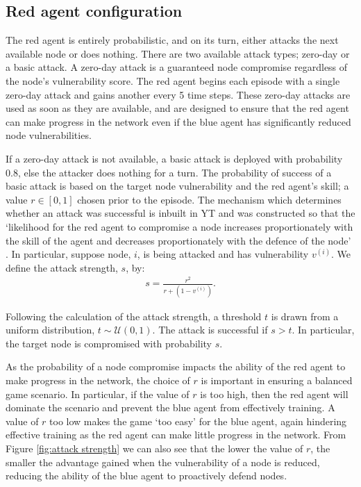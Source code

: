 \documentclass{article}
\begin{document}
\subsection{Red agent configuration}

The red agent is entirely probabilistic, and on its turn, either attacks the next available node or does nothing. There are two available attack types; zero-day or a basic attack. A zero-day attack is a guaranteed node compromise regardless of the node's vulnerability score. The red agent begins each episode with a single zero-day attack and gains another every 5 time steps. These zero-day attacks are used as soon as they are available, and are designed to ensure that the red agent can make progress in the network even if the blue agent has significantly reduced node vulnerabilities. 

If a zero-day attack is not available, a basic attack is deployed with probability 0.8, else the attacker does nothing for a turn. The probability of success of a basic attack is based on the target node vulnerability and the red agent's skill; a value $r \in [0,1]$ chosen prior to the episode. The mechanism which determines whether an attack was successful is inbuilt in YT and was constructed so that the `likelihood for the
red agent to compromise a node increases proportionately with the skill of the agent and decreases proportionately with the defence of the node' \cite{collyer2022acd}. In particular, suppose node, $i$, is being attacked and has vulnerability $v^{(i)}$. We define the attack strength, $s$, by:
\begin{align}
    s = \frac{r^2}{r + (1-v^{(i)})}.
\end{align}

Following the calculation of the attack strength, a threshold $t$ is drawn from a uniform distribution, $t \sim \mathcal{U}(0,1)$. The attack is successful if $s > t$. In particular, the target node is compromised with probability $s$.   

As the probability of a node compromise impacts the ability of the red agent to make progress in the network, the choice of $r$ is important in ensuring a balanced game scenario. In particular, if the value of $r$ is too high, then the red agent will dominate the scenario and prevent the blue agent from effectively training. A value of $r$ too low makes the game `too easy' for the blue agent, again hindering effective training as the red agent can make little progress in the network. From Figure \ref{fig:attack strength} we can also see that the lower the value of $r$, the smaller the advantage gained when the vulnerability of a node is reduced, reducing the ability of the blue agent to proactively defend nodes. 
\end{document}
